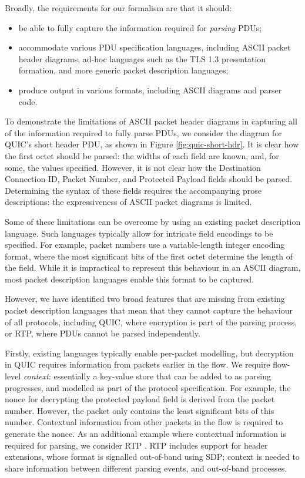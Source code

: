 \documentclass[10pt,sigconf]{acmart}
\begin{document}
Broadly, the requirements for our formalism are that it should:
\begin{itemize}
	\item be able to fully capture the information required for \emph{parsing} PDUs;
	\item accommodate various PDU specification languages, including ASCII
		  packet header diagrams, ad-hoc languages
		  such as the TLS 1.3 presentation formation, and more generic packet description
		  languages;
	\item produce output in various formats, including ASCII diagrams and parser
		  code.
\end{itemize}

To demonstrate the limitations of ASCII packet header diagrams in capturing all of the
information required to fully parse PDUs, we consider the diagram for QUIC's short header
PDU, as shown in Figure \ref{fig:quic-short-hdr}. It is clear how the
first octet should be parsed: the widths of each field are known, and, for some, the
values specified. However, it is not clear how the Destination Connection ID, Packet
Number, and Protected Payload fields should be parsed. Determining the syntax
of these fields requires the accompanying prose descriptions: the
expressiveness of ASCII packet diagrams is limited.

Some of these limitations can be overcome by using an existing packet
description language. Such languages typically allow for intricate field encodings to be
specified. For example, packet numbers use a variable-length integer encoding format,
where the most significant bits of the first octet determine the length of the field.
While it is impractical to represent this behaviour in an ASCII diagram, most packet
description languages enable this format to be captured.

However, we have identified two broad features that are missing from existing packet
description languages that mean that they cannot capture the behaviour of all 
protocols, including QUIC, where
encryption is part of the parsing process, or RTP, where PDUs cannot be
parsed independently.

Firstly, existing languages typically enable per-packet modelling, but decryption in QUIC
requires information from packets earlier in the flow. We require flow-level
\emph{context}: essentially a key-value store that can be added to as parsing progresses,
and modelled as part of the protocol specification. For example, the nonce for decrypting
the protected payload field is derived from the packet number. However, the packet only
contains the least significant bits of this number. Contextual information from other
packets in the flow is required to generate the nonce. As an additional example where 
contextual information is required for parsing, we consider RTP \cite{RFC3550}. RTP
includes support for header extensions, whose format is signalled out-of-band using SDP;
context is needed to share information between different parsing events, and out-of-band
processes.
\end{document}
